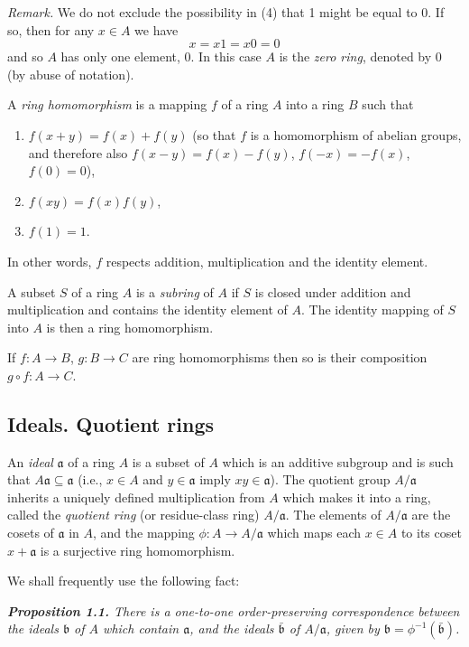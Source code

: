 \emph{Remark.}  We do not exclude the possibility in (4) that 1 might be equal to 0.
If so, then for any $x\in A$ we have
\[
x=x1=x0=0
\]
and so $A$ has only one element, 0.  In this case $A$ is the \emph{zero ring}, denoted by 0
(by abuse of notation).

A \emph{ring homomorphism} is a mapping $f$ of a ring $A$ into a ring $B$ such that
\begin{enumerate}
\renewcommand{\labelenumi}{\roman{enumi})}
\item $f(x+y)=f(x)+f(y)$ (so that $f$ is a homomorphism of abelian groups,
and therefore also $f(x-y)=f(x)-f(y)$, $f(-x)=-f(x)$, $f(0)=0$),
\item $f(xy)=f(x)f(y)$,
\item $f(1)=1$.
\end{enumerate}
In other words, $f$ respects addition, multiplication and the identity element.

A subset $S$ of a ring $A$ is a \emph{subring} of $A$ if $S$ is closed under addition and
multiplication and contains the identity element of $A$.  The identity mapping of
$S$ into $A$ is then a ring homomorphism.

If $f:A\longrightarrow B$, $g:B\longrightarrow C$ are ring homomorphisms then so is their composition
$g\circ f:A\longrightarrow C$.

\subsection{Ideals. Quotient rings}

An \emph{ideal} $\mathfrak a$ of a ring $A$ is a subset of $A$ which is an additive subgroup and is such
that $A\mathfrak a\subseteq\mathfrak a$ (i.e., $x\in A$ and $y\in\mathfrak a$ imply $xy\in\mathfrak a$).  The quotient group $A/\mathfrak a$
inherits a uniquely defined multiplication from $A$ which makes it into a ring,
called the \emph{quotient ring} (or residue-class ring) $A/\mathfrak a$.  The elements of $A/\mathfrak a$ are the
cosets of $\mathfrak a$ in $A$, and the mapping $\phi:A\longrightarrow A/\mathfrak a$ which maps each $x\in A$ to its
coset $x+\mathfrak a$ is a surjective ring homomorphism.

We shall frequently use the following fact:

\medskip
\noindent\textit{\textbf{Proposition 1.1.} There is a one-to-one order-preserving correspondence
between the ideals $\mathfrak b$ of $A$ which contain $\mathfrak a$, and the ideals $\bar{\mathfrak b}$ of $A/\mathfrak a$, given by
$\mathfrak b=\phi^{-1}(\bar{\mathfrak b})$.}
\proofbox
\medskip

